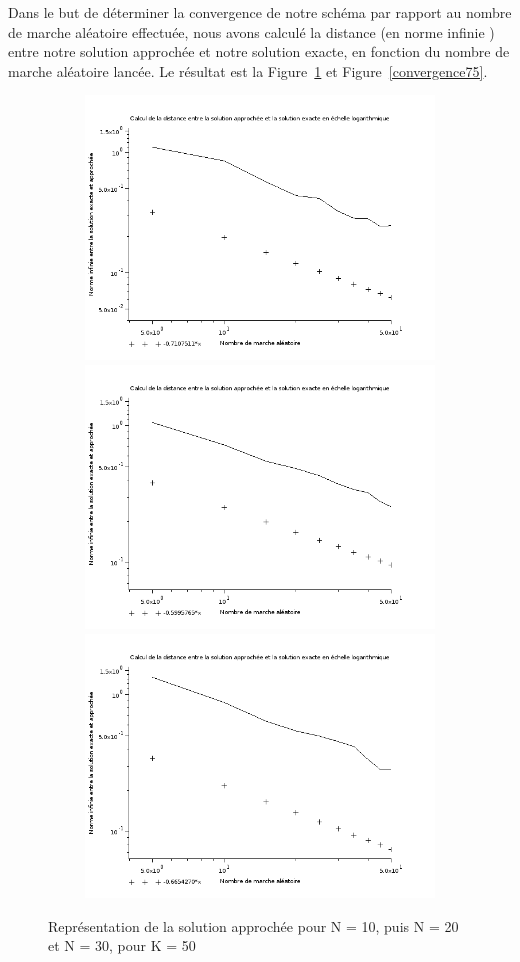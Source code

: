\documentclass[12pt, a4paper]{article}
\begin{document}
Dans le but de déterminer la convergence de notre schéma par rapport au nombre de marche aléatoire
effectuée, nous avons calculé la distance (en norme infinie ) entre notre solution approchée et notre
solution exacte, en fonction du nombre de marche aléatoire lancée. Le résultat est la
Figure~\ref{convergence50} et Figure~\ref{convergence75}.

\begin{figure}[p]
    \begin{center}
        \caption{Représentation de la solution approchée pour N = 10, puis N = 20 et N = 30, pour K = 50}
        \includegraphics[width=13cm,height=7cm]{ResultatsConvergences/Convergence_K5_S10_N10.png}
        \includegraphics[width=13cm,height=7cm]{ResultatsConvergences/Convergence_K5_S10_N20.png}
        \includegraphics[width=13cm,height=7cm]{ResultatsConvergences/Convergence_K5_S10_N30.png}
        \label{convergence50}
    \end{center}
\end{figure}
\end{document}
